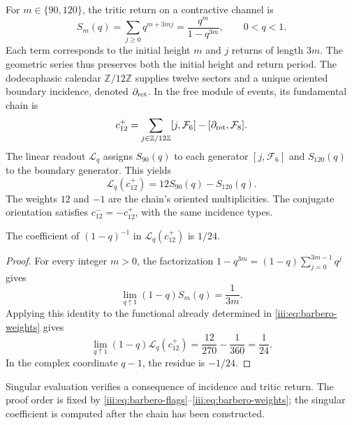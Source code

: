 For $m\in\{90,120\}$, the tritic return on a contractive channel is
\begin{equation}
 S_m(q)=\sum_{j\geq0}q^{m+3mj}
       =\frac{q^m}{1-q^{3m}},\qquad 0<q<1.
 \label{iii:eq:barbero-return-series}
\end{equation}
Each term corresponds to the initial height $m$ and $j$ returns of
length $3m$. The geometric series thus preserves both the initial
height and return period. The dodecaphasic calendar
$\mathbb Z/12\mathbb Z$ supplies twelve sectors and a unique oriented
boundary incidence, denoted $\partial_{\rm ret}$. In the free
module of events, its fundamental chain is
\begin{equation}
 c_{12}^{+}
 =\sum_{j\in\mathbb Z/12\mathbb Z}[j,\mathcal F_6]
  -[\partial_{\rm ret},\mathcal F_8].
 \label{iii:eq:barbero-cycle}
\end{equation}
The linear readout $\mathscr L_q$ assigns $S_{90}(q)$ to each generator
$[j,\mathcal F_6]$ and $S_{120}(q)$ to the boundary generator. This yields
\begin{equation}
 \mathscr L_q(c_{12}^{+})=12S_{90}(q)-S_{120}(q).
 \label{iii:eq:barbero-weights}
\end{equation}
The weights $12$ and $-1$ are the chain's oriented multiplicities.
The conjugate orientation satisfies $c_{12}^{-}=-c_{12}^{+}$, with the
same incidence types.

\begin{proposition}
\label{iii:prop:barbero-pole}
The coefficient of $(1-q)^{-1}$ in
$\mathscr L_q(c_{12}^{+})$ is $1/24$.
\end{proposition}
\begin{proof}
For every integer $m>0$, the factorization
$1-q^{3m}=(1-q)\sum_{j=0}^{3m-1}q^j$ gives
\[
 \lim_{q\uparrow1}(1-q)S_m(q)=\frac1{3m}.
\]
Applying this identity to the functional already determined in
\eqref{iii:eq:barbero-weights} gives
\begin{equation}
 \lim_{q\uparrow1}(1-q)\mathscr L_q(c_{12}^{+})
 =\frac{12}{270}-\frac1{360}=\frac1{24}.
 \label{iii:eq:barbero-pole}
\end{equation}
In the complex coordinate $q-1$, the residue is $-1/24$.
\end{proof}

Singular evaluation verifies a consequence of incidence and tritic
return. The proof order is fixed by
\eqref{iii:eq:barbero-flags}--\eqref{iii:eq:barbero-weights}; the
singular coefficient is computed after the chain has been constructed.

